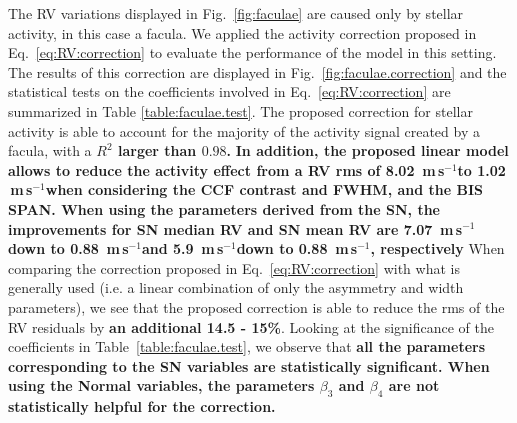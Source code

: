 \documentclass{aa}
\def\ms{\hbox{\,m\,s$^{-1}$}}         %
\begin{document}
The RV variations displayed in Fig.~\ref{fig:faculae} are caused only by stellar activity, in this case a facula. We applied the activity correction proposed in Eq.~\eqref{eq:RV:correction} to evaluate the performance of the model in this setting.
The results of this correction are displayed in Fig.~\ref{fig:faculae.correction} and the statistical tests on the coefficients involved in Eq.~\eqref{eq:RV:correction} are summarized in Table \ref{table:faculae.test}. 
The proposed correction for stellar activity is able to account for the majority of the activity signal created by a facula, with a {\bf{$R^2$ larger than $0.98$.}}
{\bf In addition, the proposed linear model allows to reduce the activity effect from a RV rms of 8.02 \ms to 1.02 \ms when considering the CCF contrast and FWHM, and the BIS SPAN. When using the parameters derived from the SN, the improvements for SN median RV and SN mean RV are 7.07 \ms down to 0.88 \ms and 5.9 \ms down to 0.88 \ms, respectively}
When comparing the correction proposed in Eq.~\eqref{eq:RV:correction} with what is generally used (i.e. a linear combination of only the asymmetry and width parameters), we see that the proposed correction is able to reduce the rms of the RV residuals by {\bf{an additional 14.5 - 15\%}}. Looking at the significance of the coefficients in Table~\ref{table:faculae.test}, we observe that {\bf{all the parameters corresponding to the SN variables are statistically significant. When using the Normal variables, the parameters $\beta_{3}$ and $\beta_{4}$ are not statistically helpful for the correction.}} 
\end{document}
